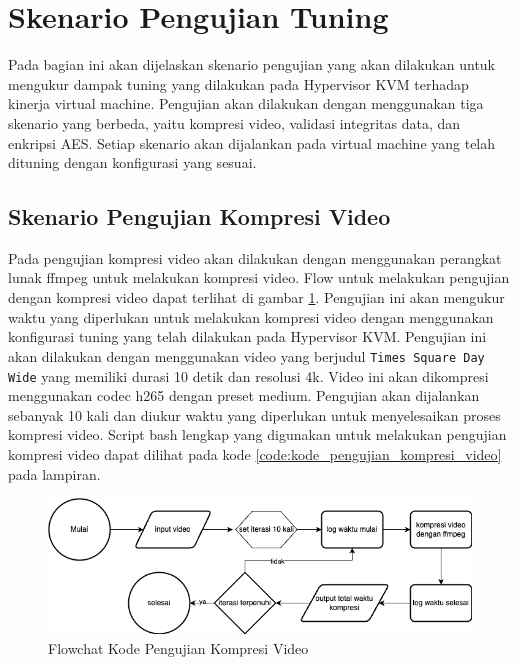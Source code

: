 \section{Skenario Pengujian Tuning}
Pada bagian ini akan dijelaskan skenario pengujian yang akan dilakukan untuk mengukur dampak tuning yang dilakukan pada Hypervisor KVM terhadap kinerja virtual machine. Pengujian akan dilakukan dengan menggunakan tiga skenario yang berbeda, yaitu kompresi video, validasi integritas data, dan enkripsi AES. Setiap skenario akan dijalankan pada virtual machine yang telah dituning dengan konfigurasi yang sesuai.

\subsection{Skenario Pengujian Kompresi Video}
Pada pengujian kompresi video akan dilakukan dengan menggunakan perangkat lunak ffmpeg untuk melakukan kompresi video. Flow untuk melakukan pengujian dengan kompresi video dapat terlihat di gambar \ref{fig:flowchart_kompresi_video}. Pengujian ini akan mengukur waktu yang diperlukan untuk melakukan kompresi video dengan menggunakan konfigurasi tuning yang telah dilakukan pada Hypervisor KVM. Pengujian ini akan dilakukan dengan menggunakan video yang berjudul \texttt{Times Square Day Wide} yang memiliki durasi 10 detik dan resolusi 4k. Video ini akan dikompresi menggunakan codec h265 dengan preset medium. Pengujian akan dijalankan sebanyak 10 kali dan diukur waktu yang diperlukan untuk menyelesaikan proses kompresi video. Script bash lengkap yang digunakan untuk melakukan pengujian kompresi video dapat dilihat pada kode \ref{code:kode_pengujian_kompresi_video} pada lampiran.

\begin{figure}
    \centering
    \includegraphics[width=1\textwidth]
    {assets/pics/code-flowchart/flowchart_kompresi_video.png}
    \caption{Flowchat Kode Pengujian Kompresi Video}
    \label{fig:flowchart_kompresi_video}
\end{figure}

